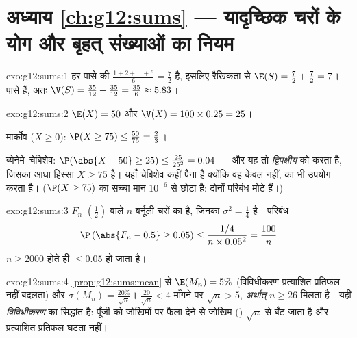 \section*{अध्याय \ref{ch:g12:sums} --- यादृच्छिक चरों के योग और बृहत् संख्याओं का नियम}

\begin{solution}{exo:g12:sums:1}
हर पासे की  $\frac{1 + 2 + \dots + 6}{6} = \frac{7}{2}$ है, इसलिए रैखिकता से $\E(S) = \frac72 + \frac72 = 7$। पासे  हैं, अतः
$\V(S) = \frac{35}{12} + \frac{35}{12} = \frac{35}{6} \approx 5.83$।
\end{solution}

\begin{solution}{exo:g12:sums:2}
$\E(X) = 50$ और $\V(X) = 100 \times 0.25 = 25$।

मार्कोव ($X \geq 0$): $\P(X \geq 75) \leq \frac{50}{75} = \frac23$।

ब्येनेमे--चेबिशेव: $\P(\abs{X - 50} \geq 25) \leq \frac{25}{25^2} = 0.04$ --- और यह तो \emph{द्विपक्षीय}  को  करता
है, जिसका आधा हिस्सा $X \geq 75$ है। यहाँ चेबिशेव कहीं पैना है क्योंकि वह केवल 
नहीं,  का भी उपयोग करता है। ($\P(X \geq 75)$ का सच्चा मान $10^{-6}$ से छोटा है: दोनों
परिबंध मोटे हैं।)
\end{solution}

\begin{solution}{exo:g12:sums:3}
$F_n$ $\left(\frac12\right)$ वाले $n$ बर्नूली चरों का  है, जिनका  $\sigma^2 = \frac14$ है।
परिबंध
\[
\P\left(\abs{F_n - 0.5} \geq 0.05\right)
\leq \frac{1/4}{n \times 0.05^2} = \frac{100}{n}
\]
$n \geq 2000$ होते ही $\leq 0.05$ हो जाता है।
\end{solution}

\begin{solution}{exo:g12:sums:4}
\cref{prop:g12:sums:mean} से $\E(M_n) = 5\%$ (विविधीकरण प्रत्याशित प्रतिफल नहीं बदलता) और $\sigma(M_n) = \frac{20\%}{\sqrt n}$। $\frac{20}{\sqrt n} < 4$ माँगने
पर $\sqrt n > 5$, \emph{अर्थात्} $n \geq 26$ मिलता है। यही \emph{विविधीकरण} का सिद्धांत है:
पूँजी को  जोखिमों पर फैला देने से जोखिम () $\sqrt n$ से बँट जाता
है और प्रत्याशित प्रतिफल घटता नहीं।
\end{solution}

